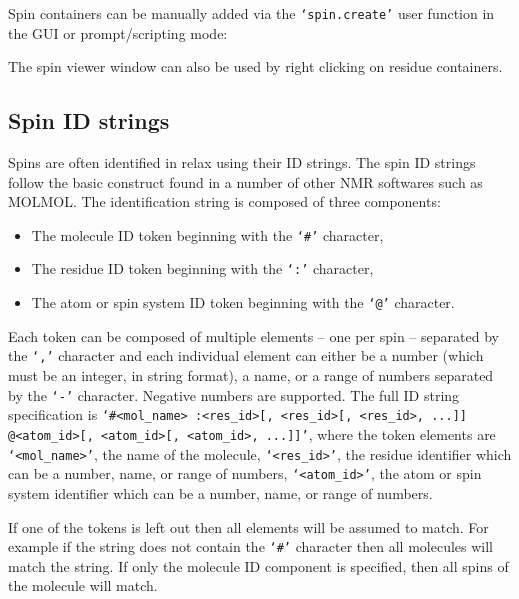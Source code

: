 Spin containers can be manually added via the \texttt{`spin.create'} user function in the GUI or prompt/scripting mode:


The spin viewer window can also be used by right clicking on residue containers.




\subsection{Spin ID strings} \label{sect: spin ID}

Spins are often identified in relax using their ID strings.  The spin ID strings follow the basic construct found in a number of other NMR softwares such as MOLMOL.  The identification string is composed of three components:

\begin{itemize}
\item The molecule ID token beginning with the \texttt{`\#'} character,
\item The residue ID token beginning with the \texttt{`:'} character,
\item The atom or spin system ID token beginning with the \texttt{`@'} character.
\end{itemize}

Each token can be composed of multiple elements -- one per spin -- separated by the \texttt{`,'} character and each individual element can either be a number (which must be an integer, in string format), a name, or a range of numbers separated by the \texttt{`-'} character.  Negative numbers are supported.  The full ID string specification is \texttt{`\#<mol\_name> :<res\_id>[, <res\_id>[, <res\_id>, ...]] @<atom\_id>[, <atom\_id>[, <atom\_id>, ...]]'}, where the token elements are \texttt{`<mol\_name>'}, the name of the molecule, \texttt{`<res\_id>'}, the residue identifier which can be a number, name, or range of numbers, \texttt{`<atom\_id>'}, the atom or spin system identifier which can be a number, name, or range of numbers.

If one of the tokens is left out then all elements will be assumed to match.  For example if the string does not contain the \texttt{`\#'} character then all molecules will match the string.  If only the molecule ID component is specified, then all spins of the molecule will match.

